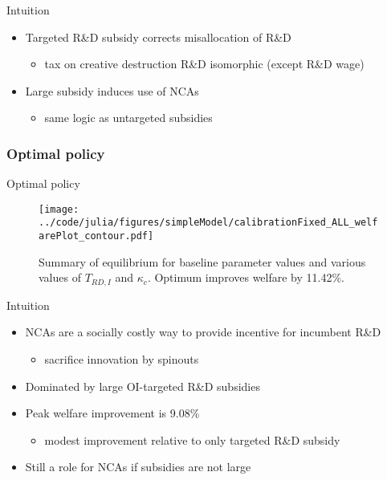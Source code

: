 \documentclass[english,usenames,dvipsnames]{beamer}
\begin{document}
\begin{frame}{Intuition}\label{OI_RDsubsidy_intuition}
	\hyperlink{OI_RDsubsidy_table}{}	
	\begin{itemize}
		\item <+-> Targeted R\&D subsidy corrects misallocation of R\&D
		\begin{itemize}
			\item tax on creative destruction R\&D isomorphic (except R\&D wage)
		\end{itemize}
		\smallskip
		\item <+-> Large subsidy induces use of NCAs
		\begin{itemize}
			\item same logic as untargeted subsidies
		\end{itemize}
		\smallskip
	\end{itemize}
\end{frame}


\subsubsection{Optimal policy}

\begin{frame}{Optimal policy} \label{plots:all_policies} 
	\hyperlink{all_policies_overview}{}
	\begin{figure}[]
		\texttt{[image: ../code/julia/figures/simpleModel/calibrationFixed\_ALL\_welfarePlot\_contour.pdf]}
		\caption{Summary of equilibrium for baseline parameter values and various values of $T_{RD,I}$ and $\kappa_c$. Optimum improves welfare by 11.42\%.}
		\label{calibration_ALL_summaryPlot}
	\end{figure}
\end{frame}

\begin{frame}{Intuition} \label{intuition:all_policies}
	\hyperlink{all_policies_overview}{}
	\begin{itemize}
		\item <+-> NCAs are a socially costly way to provide incentive for incumbent R\&D
		\begin{itemize}
			\item sacrifice innovation by spinouts
		\end{itemize}
		\smallskip
		\item <+-> Dominated by large OI-targeted R\&D subsidies
		\smallskip
		\item <+-> Peak welfare improvement is 9.08\%
		\begin{itemize}
			\item modest improvement relative to only targeted R\&D subsidy
		\end{itemize}
		\item <+-> Still a role for NCAs if subsidies are not large
		\smallskip
	\end{itemize}
\end{frame}
\end{document}
